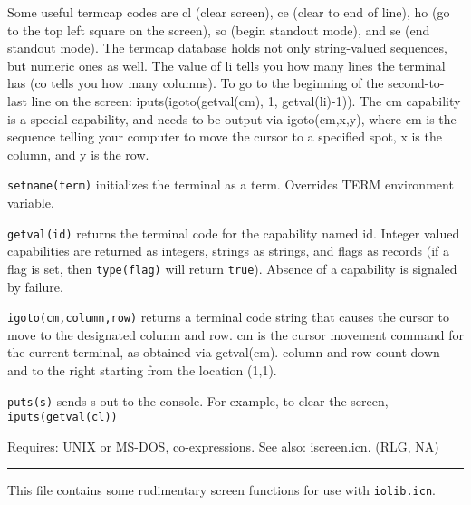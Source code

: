 Some useful termcap codes are {\textquotedbl}cl{\textquotedbl} (clear
screen), {\textquotedbl}ce{\textquotedbl} (clear to end of line),
{\textquotedbl}ho{\textquotedbl} (go to the top left square on the
screen), {\textquotedbl}so{\textquotedbl} (begin standout mode), and
{\textquotedbl}se{\textquotedbl} (end standout mode). The termcap
database holds not only string-valued sequences, but numeric ones as
well. The value of {\textquotedbl}li{\textquotedbl} tells you how many
lines the terminal has ({\textquotedbl}co{\textquotedbl} tells you how
many columns). To go to the beginning of the second-to-last line on the
screen: iputs(igoto(getval({\textquotedbl}cm{\textquotedbl}), 1,
getval({\textquotedbl}li{\textquotedbl})-1)). The
{\textquotedbl}cm{\textquotedbl} capability is a special capability,
and needs to be output via igoto(cm,x,y), where cm is the sequence
telling your computer to move the cursor to a specified spot, x is the
column, and y is the row.

\texttt{setname(term)} initializes the terminal as a term. Overrides
TERM environment variable.

\texttt{getval(id)} returns the terminal code for the capability named
id. Integer valued capabilities are returned as integers, strings as
strings, and flags as records (if a flag is set, then
\texttt{type(flag)} will return
\texttt{{\textquotedbl}true{\textquotedbl}}). Absence of a capability
is signaled by failure.

\texttt{igoto(cm,column,row)} returns a terminal code string that causes
the cursor to move to the designated column and row. cm is the cursor
movement command for the current terminal, as obtained via
getval({\textquotedbl}cm{\textquotedbl}). column and row count down and
to the right starting from the location (1,1).

\texttt{puts(s)} sends s out to the console. For example, to clear the
screen, \texttt{iputs(getval({\textquotedbl}cl{\textquotedbl}))}

Requires: UNIX or MS-DOS, co-expressions. See also: iscreen.icn. (RLG,
NA)

\vspace{0.25cm}\hrule{}

This file contains some rudimentary screen functions for use with
\texttt{iolib.icn}.

